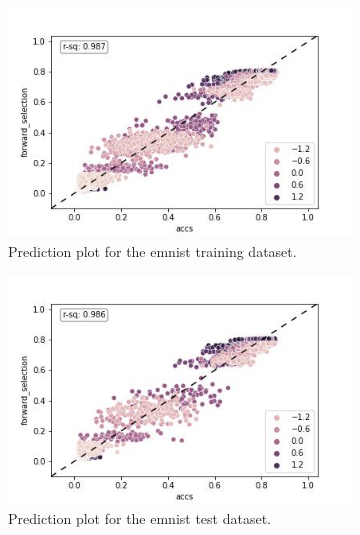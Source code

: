 \documentclass{article} %
\begin{document}
\begin{figure}
    \begin{subfigure}{.33\textwidth}
        \centering
        \includegraphics[width=.98\linewidth]{emnist/arctan_all_epochs_forward_selection.jpg}
        \caption{Prediction plot for the emnist training dataset.}
        \label{fig:emnist_prediction_plot_train}
    \end{subfigure}%
    \begin{subfigure}{.33\textwidth}
        \centering
        \includegraphics[width=.98\linewidth]{emnist/arctan_all_epochs_forward_selection_val.jpg}
        \caption{Prediction plot for the emnist test dataset.}
        \label{fig:emnist_prediction_plot_val}
    \end{subfigure}
    \begin{subfigure}{.33\textwidth}
        \centering

\end{subfigure}
\end{figure}
\end{document}
